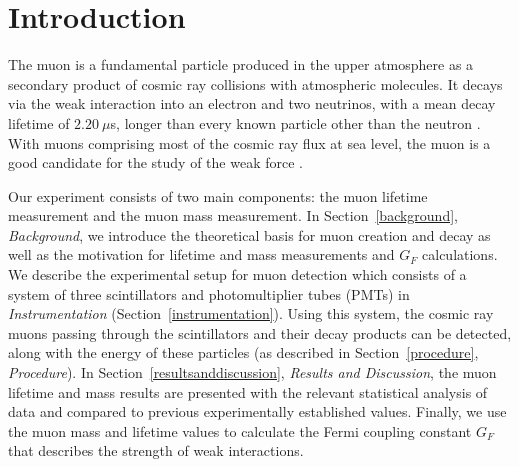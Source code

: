 
\section{Introduction}\label{introduction}

The muon is a fundamental particle produced in the upper atmosphere as
a secondary product of cosmic ray collisions with atmospheric
molecules. It decays via the weak interaction into an electron and two
neutrinos, with a mean decay lifetime of $2.20~\mu$s, longer than
every known particle other than the neutron \cite{pdg}. With muons
comprising most of the cosmic ray flux at sea level, the muon is a
good candidate for the study of the weak force \cite[p.~8]{rossi}.

Our experiment consists of two main components: the muon lifetime
measurement and the muon mass measurement. In
Section~\ref{background}, \emph{Background}, we introduce the
theoretical basis for muon creation and decay as well as the
motivation for lifetime and mass measurements and $G_{F}$ calculations. We describe the
experimental setup for muon detection which consists of a system of
three scintillators and photomultiplier tubes (PMTs) in
\emph{Instrumentation} (Section~\ref{instrumentation}). Using this
system, the cosmic ray muons passing through the scintillators and
their decay products can be detected, along with the energy of these
particles (as described in Section~\ref{procedure}, \emph{Procedure}). In Section~\ref{resultsanddiscussion}, \emph{Results and Discussion}, the muon lifetime and
mass results are presented with the relevant statistical analysis of
data and compared to previous experimentally established
values. Finally, we use the muon mass and lifetime values to calculate
the Fermi coupling constant $G_F$ that describes the strength of weak
interactions.
